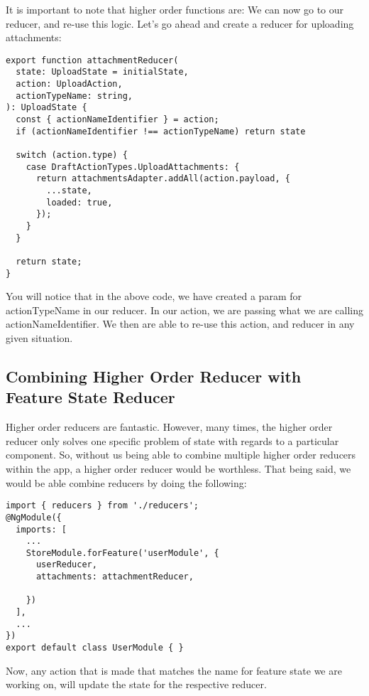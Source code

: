 It is important to note that higher order functions are:
We can now go to our reducer, and re-use this logic. Let's
go ahead and create a reducer for uploading attachments:

\begin{lstlisting}
export function attachmentReducer(
  state: UploadState = initialState,
  action: UploadAction,
  actionTypeName: string,
): UploadState {
  const { actionNameIdentifier } = action;
  if (actionNameIdentifier !== actionTypeName) return state

  switch (action.type) {
    case DraftActionTypes.UploadAttachments: {
      return attachmentsAdapter.addAll(action.payload, {
        ...state,
        loaded: true,
      });
    }
  }

  return state;
}
\end{lstlisting}

You will notice that in the above code, we have created a param for
actionTypeName in our reducer. In our action, we are passing what we are calling
actionNameIdentifier. We then are able to re-use this action, and reducer in any
given situation.

\subsection{Combining Higher Order Reducer with Feature State Reducer }

Higher order reducers are fantastic. However, many times, the higher order
reducer only solves one specific problem of state with regards to a particular
component. So, without us being able to combine multiple higher order reducers
within the app, a higher order reducer would be worthless. That being said, we
would be able combine reducers by doing the following:

\begin{lstlisting}
import { reducers } from './reducers';
@NgModule({
  imports: [
    ...
    StoreModule.forFeature('userModule', {
      userReducer,
      attachments: attachmentReducer,

    })
  ],
  ...
})
export default class UserModule { }
\end{lstlisting}

Now, any action that is made that matches the name for feature state we are
working on, will update the state for the respective reducer.

